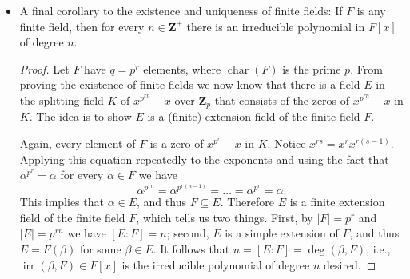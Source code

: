 \documentclass[11pt]{article}
\newcommand{\Z}{\mathbf{Z}}
\newcommand{\la}{\langle}
\newcommand{\ra}{\rangle}
\newcommand{\abs}[1]{\lvert #1 \rvert}
\newcommand{\kar}{\operatorname{char}}
\newcommand{\irr}{\operatorname{irr}}
\renewcommand{\simeq}{\cong}
\begin{document}
\begin{itemize}
\begin{itemize}
        (Proof 2, from Fraleigh, without splitting field) We want to show that for $E$ and $E'$ of order $p^n$, $E \simeq E'$.
        
        Since $E$ is a finite extension of $\Z_p$ with order $p^n$, it is a simple extension of degree $n$ over $\Z_p$. Thus for some $\alpha 
        \in E$ we have $f(x) \coloneqq \irr(\alpha,\Z_p) \in \Z_p[x]$ of degree $n$ such that $E \simeq \Z_p[x]/\la f(x) \ra$. Since the elements of $E$ are zeros of $x^{p^n}-x$ in some splitting field $K$ of it over $\Z_p$, $f(x) = \irr(\alpha,\Z_p)$ must divide $x^{p^n} - x$.
        
        Because $E'$ also consists of zeros of $x^{p^n}-x$ in some splitting field $K'$ of it over $\Z_p$, $E'$ must contain the zeros of $f(x)$ over $K'$ because $f(x) \mid (x^{p^n}-x)$. Let $\alpha' \in E'$ be such a zero of the irreducible $f(x)$. It follows that $f(x) = \irr(\alpha',\Z_p)$, which implies that $E \simeq \Z_p[x]/\la f(x) \ra \simeq \Z_p(\alpha') \subseteq E'$. Yet $E$ and $E'$ are of the same order $p^n$, so $E \simeq E'$, as desired.
    \end{itemize}
    \item A final corollary to the existence and uniqueness of finite fields: If $F$ is any finite field, then for every $n \in \Z^+$ there is an irreducible polynomial in $F[x]$ of degree $n$.
        \begin{proof}
            Let $F$ have $q = p^r$ elements, where $\kar(F)$ is the prime $p$. From proving the existence of finite fields we now know that there is a field $E$ in the splitting field $K$ of $x^{p^{rn}}-x$ over $\Z_p$ that consists of the zeros of $x^{p^{rn}}-x$ in $K$. The idea is to show $E$ is a (finite) extension field of the finite field $F$.

            Again, every element of $F$ is a zero of $x^{p^r}-x$ in $K$. Notice $x^{rs} = x^r x^{r(s-1)}$. Applying this equation repeatedly to the exponents and using the fact that $\alpha^{p^r} = \alpha$ for every $\alpha \in F$ we have \[\alpha^{p^{rn}} = \alpha^{p^{r(n-1)}} = \dots = \alpha^{p^r} = \alpha.\] This implies that $\alpha \in E$, and thus $F \subseteq E$. Therefore $E$ is a finite extension field of the finite field $F$, which tells us two things. First, by $\abs{F} = p^r$ and $\abs{E} = p^{rn}$ we have $[E:F] = n$; second, $E$ is a simple extension of $F$, and thus $E = F(\beta)$ for some $\beta \in E$. It follows that $n = [E:F] = \deg(\beta,F)$, i.e., $\irr(\beta,F) \in F[x]$ is the irreducible polynomial of degree $n$ desired.
        \end{proof}
\end{itemize}
\end{document}
